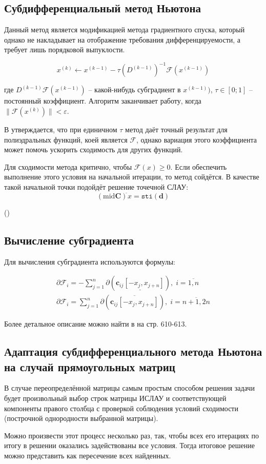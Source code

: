 \subsection{Субдифференциальный метод Ньютона}

Данный метод является модификацией метода градиентного спуска, который однако не накладывает на отображение требования дифференцируемости, а требует лишь порядковой выпуклости.

\begin{equation*}
	x^{(k)} \leftarrow x^{(k - 1)} - \tau(D^{(k - 1)})^{-1}\mathcal{F}(x^{(k - 1)})
\end{equation*}

где $D^{(k - 1)}\mathcal{F}(x^{(k - 1)})$ -- какой-нибудь субградиент в $x^{(k - 1)})$, $\tau \in [0; 1]$ -- постоянный коэффициент. Алгоритм заканчивает работу, когда $\| \mathcal{F}(x^{(k)}) \| < \varepsilon$.

В \cite{shary} утверждается, что при единичном $\tau$ метод даёт точный результат для полиэдральных функций, коей является $\mathcal{F}$, однако вариация этого коэффициента может помочь ускорить сходимость для других функций.

Для сходимости метода критично, чтобы $\mathcal{F}(x) \geq 0$. Если обеспечить выполнение этого условия на начальной итерации, то метод сойдётся. В качестве такой начальной точки подойдёт решение точечной СЛАУ:
\begin{equation}
(\textrm{mid} \mathbf{C})^{\tilde{}}x = \texttt{sti}(\mathbf{d})
\end{equation}

 (\cite[стр. 607]{shary})

\subsection{Вычисление субградиента}

Для вычисления субградиента используются формулы:

\begin{align}
\partial\mathcal{F}_i=-\sum_{j=1}^{n}\partial(\underline{\mathbf{c}_{ij}[-x_j, x_{j+n}]}), \;i = \overline{1,n} \\
\partial\mathcal{F}_i=\sum_{j=1}^{n}\partial(\overline{\mathbf{c}_{ij}[-x_j, x_{j+n}]}), \;i = \overline{n+1,2n}
\end{align}

Более детальное описание можно найти в \cite{shary} на стр. 610-613.

\subsection{Адаптация субдифференциального метода Ньютона на случай прямоугольных матриц}

В случае переопределённой матрицы самым простым способом решения задачи будет произвольный выбор строк матрицы ИСЛАУ и соответствующей компоненты правого столбца с проверкой соблюдения условий сходимости (построчной однородности выбранной матрицы).

Можно произвести этот процесс несколько раз, так, чтобы всех его итерациях по итогу в решении оказались задействованы все условия. Тогда итоговое решение можно представить как пересечение всех найденных.